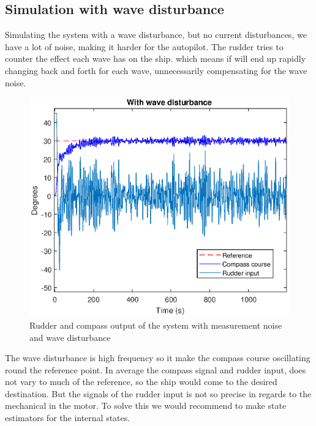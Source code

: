 \subsection{Simulation with wave disturbance}\label{p3d}
Simulating the system with a wave disturbance, but no current disturbances, we have a lot of noise, making it harder for the autopilot. The rudder tries to counter the effect each wave has on the ship. which means if will end up rapidly changing back and forth for each wave, unnecessarily compensating for the wave noise. 
\begin{figure}[H]
    \centering
    \includegraphics[width=0.6\linewidth]{Part3_pics/ny_3d.eps}
    \caption{Rudder and compass output of the system with measurement noise and wave disturbance}
    \label{fig:p3d}
\end{figure}
The wave disturbance is high frequency so it make the compass course oscillating round the reference point. In average the compass signal and rudder input, does not vary to much of the reference, so the ship would come to the desired destination. But the signals of the rudder input is not so precise in regards to the mechanical in the motor. To solve this we would recommend to make state estimators for the internal states. 